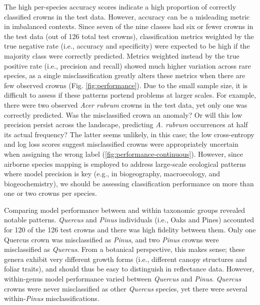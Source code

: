 The high per-species accuracy scores indicate a high proportion of correctly classified crowns in the test data. However, accuracy can be a misleading metric in imbalanced contexts. Since seven of the nine classes had six or fewer crowns in the test data (out of 126 total test crowns), classification metrics weighted by the true negative rate (i.e., accuracy and specificity) were expected to be high if the majority class were correctly predicted. Metrics weighted instead by the true positive rate (i.e., precision and recall) showed much higher variation across rare species, as a single misclassification greatly alters these metrics when there are few observed crowns (Fig. \ref{fig:performance}). Due to the small sample size, it is difficult to assess if these patterns portend problems at larger scales. For example, there were two observed \textit{Acer rubrum} crowns in the test data, yet only one was correctly predicted. Was the misclassified crown an anomaly? Or will this low precision persist across the landscape, predicting \textit{A. rubrum} occurrences at half its actual frequency? The latter seems unlikely, in this case; the low cross-entropy and log loss scores suggest misclassified crowns were appropriately uncertain when assigning the wrong label (\ref{fig:performance-continuous}). However, since airborne species mapping is employed to address large-scale ecological patterns where model precision is key (e.g., in biogeography, macroecology, and biogeochemistry), we should be assessing classification performance on more than one or two crowns per species.

Comparing model performance between and within taxonomic groups revealed notable patterns. \textit{Quercus} and \textit{Pinus} individuals (i.e., Oaks and Pines) accounted for 120 of the 126 test crowns and there was high fidelity between them. Only one Quercus crown was misclassified as \textit{Pinus}, and two \textit{Pinus} crowns were misclassified as \textit{Quercus}. From a botanical perspective, this makes sense; these genera exhibit very different growth forms (i.e., different canopy structures and foliar traits), and should thus be easy to distinguish in reflectance data. However, within-genus model performance varied between \textit{Quercus} and \textit{Pinus}. \textit{Quercus} crowns were never misclassified as other \textit{Quercus} species, yet there were several within-\textit{Pinus} misclassifications. 

